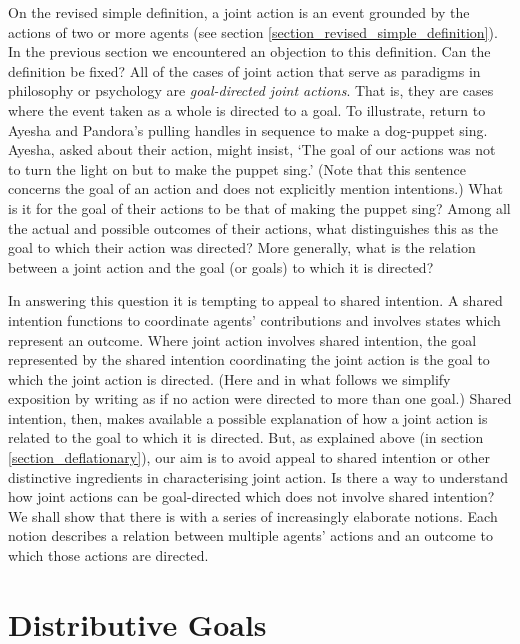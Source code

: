 \documentclass[12pt,a4paper]{extarticle}
\begin{document}
On the revised simple definition, a joint action is an event grounded by the actions of two or more agents 
(see section \vref{section_revised_simple_definition}).
In the previous section we encountered an objection to this definition.
Can the definition be fixed?
All of the cases of joint action that serve as paradigms in  philosophy or psychology are \emph{goal-directed joint actions}.
That is, they are cases where the event taken as a whole is directed to a goal.
To illustrate, return to Ayesha and Pandora's pulling handles in sequence to make a dog-puppet sing.
Ayesha, asked about their action, might insist, `The goal of our actions was not to turn the light on but to make the puppet sing.'
(Note that this sentence concerns the goal of an action and does not explicitly mention intentions.)
What is it for the goal of their actions to be that of making the puppet sing?
Among all the actual and possible outcomes of their actions, what distinguishes this as the goal to which their action was directed?
More generally, {what is the relation between a joint action and the goal (or goals) to which it is directed?}

In answering this question it is tempting to appeal to shared intention.
A shared intention functions to coordinate agents' contributions and involves states which represent an outcome.
Where joint action involves shared intention, 
the goal represented by the shared intention coordinating the joint action is the goal to which the joint action is directed.
(Here and in what follows we simplify exposition by writing as if no action were directed to more than one goal.)
Shared intention, then, makes available a possible explanation of how a joint action is related to the goal to which it is directed.
But, as explained above (in section \ref{section_deflationary}), our aim is to avoid appeal to shared intention or other distinctive ingredients in characterising joint action.
Is there a way to understand how joint actions can be goal-directed which does not involve shared intention?
We shall show that there is with a series of increasingly elaborate notions.  
Each notion describes a relation between multiple agents' actions and an outcome to which those actions are directed.

\label{end_section_goal_directed_joint_action}


\section{Distributive Goals}
	\label{section_distributive_goals}
\end{document}
